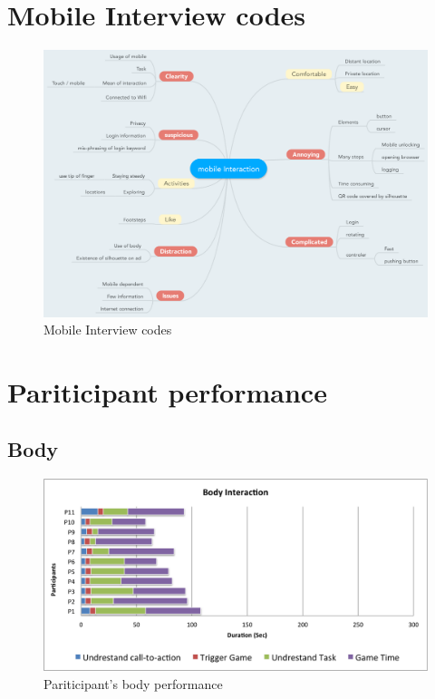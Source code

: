 \begin{appendices}
\section{Mobile Interview codes}
\begin{minipage}{1.14\textwidth}
\begin{flushleft} 
\begin{figure}[H]
 \centering 
    \includegraphics[width = \textwidth, height=0.8\textheight]{Appendices/6/mobile_Interaction.pdf}
    \caption{Mobile Interview codes}
     \label{app:mobileinterviewcodes_}%
\end{figure}
\end{flushleft} 
\end{minipage}



\section{Pariticipant performance}

\subsection{Body}
\begin{figure}[H]
    \centering
    \includegraphics[width=\textwidth,height=0.35\textheight]{Appendices/6/body_performance}%
    \caption{Pariticipant's body performance}%
    \label{app:body_performance}%
\end{figure}



\end{appendices}
